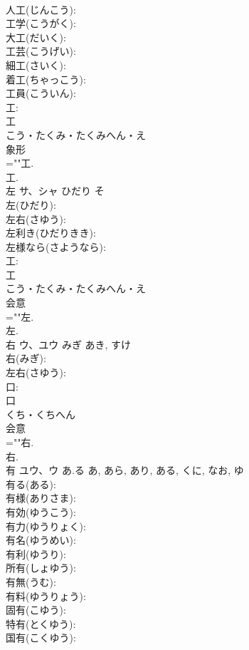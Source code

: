 \documentclass[8pt]{extreport}
\begin{document}
\begin{CJK}{UTF8}{min}
\\	人工(じんこう): 
\\	工学(こうがく): 
\\	大工(だいく): 
\\	工芸(こうげい): 
\\	細工(さいく): 
\\	着工(ちゃっこう): 
\\	工員(こういん): 
\\	工: 
\\	工	
\\	こう・たくみ・たくみへん・え	
\\	象形 
\\	=""工.
\\	工.
\\	左	サ、シャ	ひだり	そ	
\\	左(ひだり): 
\\	左右(さゆう): 
\\	左利き(ひだりきき): 
\\	左様なら(さようなら): 
\\	工: 
\\	工	
\\	こう・たくみ・たくみへん・え	
\\	会意 
\\	=""左.
\\	左.
\\	右	ウ、ユウ	みぎ	あき, すけ	
\\	右(みぎ): 
\\	左右(さゆう): 
\\	口: 
\\	口	
\\	くち・くちへん	
\\	会意 
\\	=""右.
\\	右.
\\	有	ユウ、ウ	あ.る	あ, あら, あり, ある, くに, なお, ゆ	
\\	有る(ある): 
\\	有様(ありさま): 
\\	有効(ゆうこう): 
\\	有力(ゆうりょく): 
\\	有名(ゆうめい): 
\\	有利(ゆうり): 
\\	所有(しょゆう): 
\\	有無(うむ): 
\\	有料(ゆうりょう): 
\\	固有(こゆう): 
\\	特有(とくゆう): 
\\	国有(こくゆう): 

\end{CJK}
\end{document}
